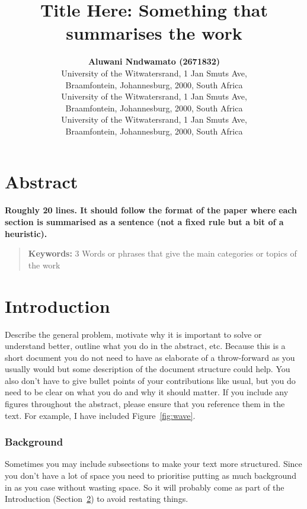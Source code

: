 \documentclass[10pt,letterpaper]{article}
\title{Title Here: Something that summarises the work}
\author{{\large \bf Aluwani Nndwamato (2671832)} \\ University of the Witwatersrand, 1 Jan Smuts Ave,\\ Braamfontein, Johannesburg, 2000, South Africa
  \AND {\large \bf Author 2 } \\ University of the Witwatersrand, 1 Jan Smuts Ave,\\ Braamfontein, Johannesburg, 2000, South Africa
  \AND {\large \bf Author 3} \\ University of the Witwatersrand, 1 Jan Smuts Ave,\\ Braamfontein, Johannesburg, 2000, South Africa}
\begin{document}
\maketitle
\phantom{.}
\newpage
\phantom{.}
\newpage
\section{Abstract}
{
\bf
{}
Roughly 20 lines. It should follow the format of the paper where each section is summarised as a sentence (not a fixed rule but a bit of a heuristic).
}
\begin{quote}
\small
\textbf{Keywords:} 
3 Words or phrases that give the main categories or topics of the work
\end{quote}

\section{Introduction} \label{Intro}
Describe the general problem, motivate why it is important to solve or understand better, outline what you do in the abstract, etc. Because this is a short document you do not need to have as elaborate of a throw-forward as you usually would but some description of the document structure could help. You also don't have to give bullet points of your contributions like usual, but you do need to be clear on what you do and why it should matter. If you include any figures throughout the abstract, please ensure that you reference them in the text. For example, I have included Figure~\ref{fig:wave}.

\subsubsection{Background}
Sometimes you may include subsections to make your text more structured. Since you don't have a lot of space you need to prioritise putting as much background in as you case without wasting space. So it will probably come as part of the Introduction (Section~\ref{Intro}) to avoid restating things.
\end{document}
